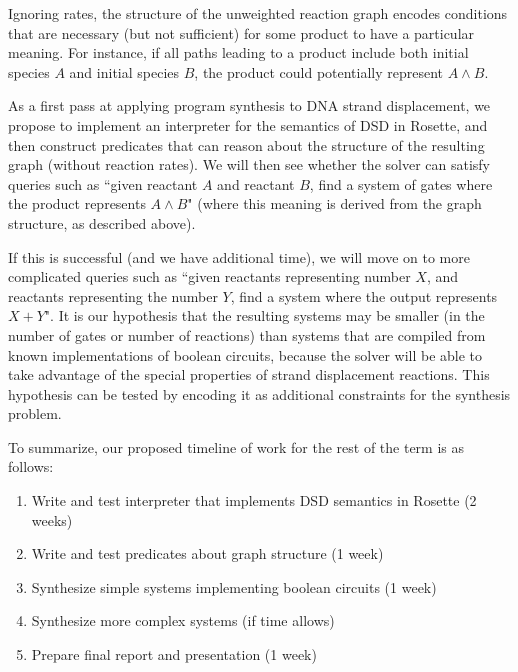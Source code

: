 \documentclass{article}
\begin{document}
Ignoring rates, the structure of the unweighted reaction graph encodes
conditions that are necessary (but not sufficient) for some product to have a
particular meaning. For instance, if all paths leading to a product include both
initial species $A$ and initial species $B$, the product could potentially
represent $A \land B$.

As a first pass at applying program synthesis to DNA strand displacement, we
propose to implement an interpreter for the semantics of DSD in Rosette, and
then construct predicates that can reason about the structure of the resulting
graph (without reaction rates). We will then see whether the solver can satisfy
queries such as ``given reactant $A$ and reactant $B$, find a system of gates
where the product represents $A \land B$" (where this meaning is derived from
the graph structure, as described above).

If this is successful (and we have additional time), we will move on to more
complicated queries such as ``given reactants representing number $X$, and
reactants representing the number $Y$, find a system where the output represents
$X + Y$".  It is our hypothesis that the resulting systems may be smaller (in
the number of gates or number of reactions) than systems that are compiled from
known implementations of boolean circuits, because the solver will be able
to take advantage of the special properties of strand displacement reactions.
This hypothesis can be tested by
encoding it as additional constraints for the synthesis problem.

To summarize, our proposed timeline of work for the rest of the term is as
follows:
\begin{enumerate}
\item
Write and test interpreter that implements DSD semantics in Rosette (2
weeks)

\item
Write and test predicates about graph structure (1 week)

\item
Synthesize simple systems implementing boolean circuits (1 week)

\item
Synthesize more complex systems (if time allows)

\item
Prepare final report and presentation (1 week)
\end{enumerate}
\end{document}
